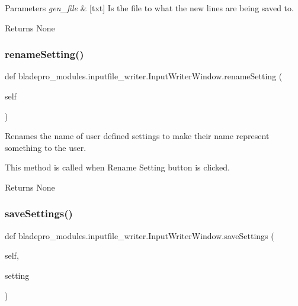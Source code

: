 \begin{DoxyParams}{Parameters}
{\em gen\+\_\+file} & \mbox{[}txt\mbox{]} Is the file to what the new lines are being saved to. \\
\hline
\end{DoxyParams}
\begin{DoxyReturn}{Returns}
None 
\end{DoxyReturn}
\hypertarget{a00071_a464a8ac16bcb67d41a6d91ee8b51acf2}{}\label{a00071_a464a8ac16bcb67d41a6d91ee8b51acf2} 
\subsubsection{\texorpdfstring{rename\+Setting()}{renameSetting()}}
{\footnotesize\ttfamily def bladepro\+\_\+modules.\+inputfile\+\_\+writer.\+Input\+Writer\+Window.\+rename\+Setting (\begin{DoxyParamCaption}\item[{}]{self }\end{DoxyParamCaption})}



Renames the name of user defined settings to make their name represent something to the user. 

This method is called when Rename Setting button is clicked.

\begin{DoxyReturn}{Returns}
None 
\end{DoxyReturn}
\hypertarget{a00071_a723573fade09f206a9c89569885558c1}{}\label{a00071_a723573fade09f206a9c89569885558c1} 
\subsubsection{\texorpdfstring{save\+Settings()}{saveSettings()}}
{\footnotesize\ttfamily def bladepro\+\_\+modules.\+inputfile\+\_\+writer.\+Input\+Writer\+Window.\+save\+Settings (\begin{DoxyParamCaption}\item[{}]{self,  }\item[{}]{setting }\end{DoxyParamCaption})}



